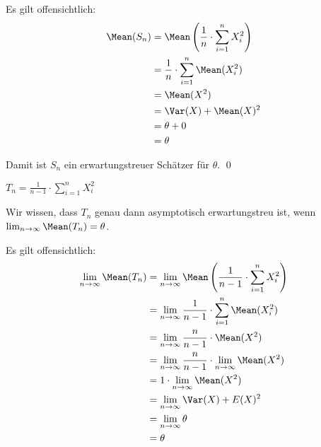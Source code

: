 \documentclass{abgabe}
\begin{document}
\begin{questions}
\begin{parts}
\begin{subparts}
\begin{solution}
                Es gilt offensichtlich:
                \begin{alignat*}{1}
                    \Mean(S_n) & = \Mean \left( \frac{1}{n} \cdot \sum_{i=1}^{n} X_i^2 \right) \\
                               & = \frac{1}{n} \cdot \sum_{i=1}^{n} \Mean ( X_i^2 )            \\
                               & = \Mean ( X^2 )                                               \\
                               & = \Var(X) + \Mean(X)^2                                        \\
                               & = \theta + 0                                                  \\
                               & = \theta
                \end{alignat*}

                Damit ist $S_n$ ein erwartungstreuer Schätzer für $\theta$.
                \qed
            \end{solution}

            \subpart
            $T_n = \frac{1}{n-1} \cdot \sum_{i=1}^{n} X_i^2$
            \begin{solution}
                Wir wissen, dass $T_n$ genau dann asymptotisch erwartungstreu ist, wenn $\lim_{n\to\infty}\Mean(T_n) = \theta$.

                Es gilt offensichtlich:
                \begin{alignat*}{1}
                    \lim_{n\to\infty}\Mean(T_n) & = \lim_{n\to\infty} \Mean\left( \frac{1}{n-1} \cdot \sum_{i=1}^{n} X_i^2 \right) \\
                                                & = \lim_{n\to\infty} \frac{1}{n-1} \cdot \sum_{i=1}^{n}  \Mean (X_i^2 )           \\
                                                & = \lim_{n\to\infty} \frac{n}{n-1} \cdot \Mean ( X^2 )                            \\
                                                & = \lim_{n\to\infty} \frac{n}{n-1} \cdot \lim_{n\to\infty} \Mean ( X^2 )          \\
                                                & = 1 \cdot \lim_{n\to\infty} \Mean ( X^2 )                                        \\
                                                & = \lim_{n\to\infty} \Var(X) + E(X)^2                                             \\
                                                & = \lim_{n\to\infty} \theta                                                       \\
                                                & = \theta
                \end{alignat*}


\end{solution}
\end{subparts}
\end{parts}
\end{questions}
\end{document}
